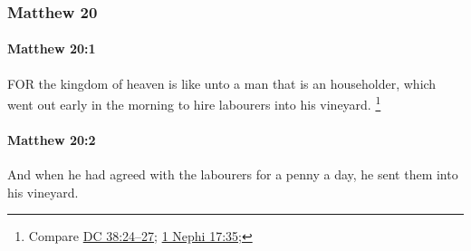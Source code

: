 	\subsubsection{Matthew 20} %
		\label{MATTHEW-20}
		
		\paragraph{Matthew 20:1} %
			\label{MATTHEW-20-1}

			FOR the kingdom of heaven is like unto a man that is an householder, which went out early in the morning to hire labourers into his vineyard.%
				\footnote{%
					Compare \hyperref[DC38-24]{DC 38:24--27}; \hyperref[1NEPHI-17-35]{1 Nephi 17:35};
					}

			\begin{framed}
			\scriptsize
				\begin{compactdesc}
					\item[SBLG] 
				\end{compactdesc}
			\end{framed}

		\paragraph{Matthew 20:2} %
			\label{MATTHEW-20-2}

			And when he had agreed with the labourers for a penny a day, he sent them into his vineyard.

